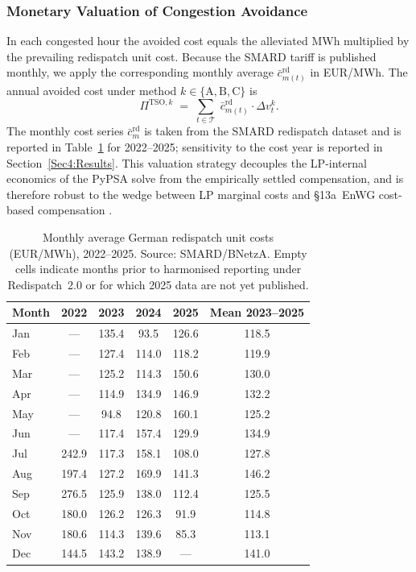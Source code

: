 \subsubsection{Monetary Valuation of Congestion Avoidance}\label{Subsubsec3:Monetary_valuation}
 
In each congested hour the avoided cost equals the alleviated MWh multiplied by the prevailing redispatch unit cost. Because the SMARD tariff is published monthly, we apply the corresponding monthly average $\bar{c}^{\mathrm{rd}}_{m(t)}$ in EUR/MWh. The annual avoided cost under method $k \in \{\mathrm{A,B,C}\}$ is
\begin{equation}
    \Pi^{\mathrm{TSO},k}
    \;=\; \sum_{t \in \mathcal{T}} \;\bar{c}^{\mathrm{rd}}_{m(t)} \cdot \Delta v^{k}_t.
    \label{eq:tso_revenue}
\end{equation}
The monthly cost series $\bar{c}^{\mathrm{rd}}_{m}$ is taken from the SMARD redispatch dataset and is reported in Table~\ref{Tab:Redispatch_Cost_2022_2025} for 2022--2025; sensitivity to the cost year is reported in Section~\ref{Sec4:Results}. This valuation strategy decouples the LP-internal economics of the PyPSA solve from the empirically settled compensation, and is therefore robust to the wedge between LP marginal costs and \S13a~EnWG cost-based compensation \citep{staudt_2018_predicting_redispatch_in_the_german_elelectricity_market, BNetzA_Redispatch_Kosten_2023}.
 
\begin{table}[htbp]
\centering
\caption{Monthly average German redispatch unit costs (EUR/MWh), 2022--2025. Source: SMARD/BNetzA. Empty cells indicate months prior to harmonised reporting under Redispatch~2.0 or for which 2025 data are not yet published.}
\label{Tab:Redispatch_Cost_2022_2025}
\small
\begin{tabular}{lccccc}
\toprule
Month & 2022 & 2023 & 2024 & 2025 & Mean 2023--2025 \\
\midrule
Jan & ---   & 135.4 & 93.5  & 126.6 & 118.5 \\
Feb & ---   & 127.4 & 114.0 & 118.2 & 119.9 \\
Mar & ---   & 125.2 & 114.3 & 150.6 & 130.0 \\
Apr & ---   & 114.9 & 134.9 & 146.9 & 132.2 \\
May & ---   & 94.8  & 120.8 & 160.1 & 125.2 \\
Jun & ---   & 117.4 & 157.4 & 129.9 & 134.9 \\
Jul & 242.9 & 117.3 & 158.1 & 108.0 & 127.8 \\
Aug & 197.4 & 127.2 & 169.9 & 141.3 & 146.2 \\
Sep & 276.5 & 125.9 & 138.0 & 112.4 & 125.5 \\
Oct & 180.0 & 126.2 & 126.3 & 91.9  & 114.8 \\
Nov & 180.6 & 114.3 & 139.6 & 85.3  & 113.1 \\
Dec & 144.5 & 143.2 & 138.9 & ---   & 141.0 \\
\bottomrule
\end{tabular}
\end{table}
 
